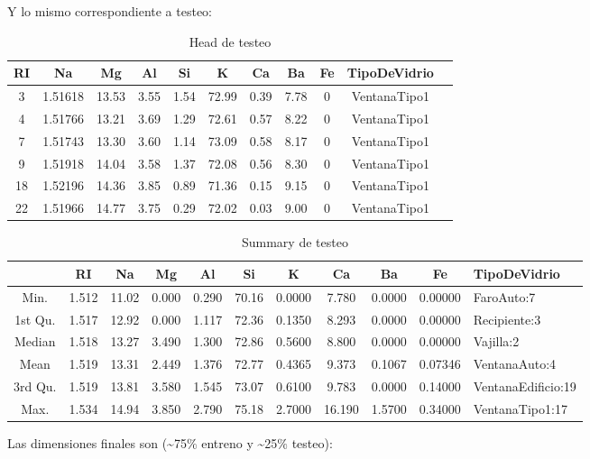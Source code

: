 Y lo mismo correspondiente a testeo:
\begin{table}[H]
  \centering
  \begin{tabular}{ccccccccccl}
    \toprule
    RI & Na & Mg & Al & Si & K & Ca & Ba & Fe & TipoDeVidrio \\
    \midrule
    3 & 1.51618 & 13.53 & 3.55 & 1.54 & 72.99 & 0.39 & 7.78 & 0 & VentanaTipo1 \\
    4 & 1.51766 & 13.21 & 3.69 & 1.29 & 72.61 & 0.57 & 8.22 & 0 & VentanaTipo1 \\
    7 & 1.51743 & 13.30 & 3.60 & 1.14 & 73.09 & 0.58 & 8.17 & 0 & VentanaTipo1 \\
    9 & 1.51918 & 14.04 & 3.58 & 1.37 & 72.08 & 0.56 & 8.30 & 0 & VentanaTipo1 \\
    18 & 1.52196 & 14.36 & 3.85 & 0.89 & 71.36 & 0.15 & 9.15 & 0 & VentanaTipo1 \\
    22 & 1.51966 & 14.77 & 3.75 & 0.29 & 72.02 & 0.03 & 9.00 & 0 & VentanaTipo1 \\
    \bottomrule
  \end{tabular}
  \caption{Head de testeo}
  \label{tabla_ejemplo}
\end{table}
\begin{table}[H]
  \centering

  \begin{tabular}{ccccccccccl}
    \toprule
    & RI & Na & Mg & Al & Si & K & Ca & Ba & Fe & TipoDeVidrio \\
    \midrule
    Min.    & 1.512 & 11.02 & 0.000 & 0.290 & 70.16 & 0.0000 & 7.780 & 0.0000 & 0.00000 & FaroAuto:7 \\
    1st Qu. & 1.517 & 12.92 & 0.000 & 1.117 & 72.36 & 0.1350 & 8.293 & 0.0000 & 0.00000 & Recipiente:3 \\
    Median  & 1.518 & 13.27 & 3.490 & 1.300 & 72.86 & 0.5600 & 8.800 & 0.0000 & 0.00000 & Vajilla:2 \\
    Mean    & 1.519 & 13.31 & 2.449 & 1.376 & 72.77 & 0.4365 & 9.373 & 0.1067 & 0.07346 & VentanaAuto:4 \\
    3rd Qu. & 1.519 & 13.81 & 3.580 & 1.545 & 73.07 & 0.6100 & 9.783 & 0.0000 & 0.14000 & VentanaEdificio:19 \\
    Max.    & 1.534 & 14.94 & 3.850 & 2.790 & 75.18 & 2.7000 & 16.190 & 1.5700 & 0.34000 & VentanaTipo1:17 \\
    \bottomrule
  \end{tabular}
    \caption{Summary de testeo}
  \label{tabla_descripcion}
\end{table}
Las dimensiones finales son (\textasciitilde75$\%$ entreno y \textasciitilde25$\%$ testeo):

